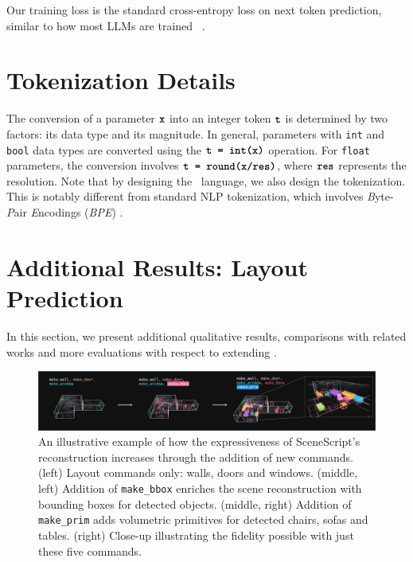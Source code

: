 Our training loss is the standard cross-entropy loss on next token prediction, similar to how most LLMs are trained ~\cite{openai2023gpt4,sutskever2014sequence}. 



%
\section{Tokenization Details}

The conversion of a parameter $\textbf{\texttt{x}}$ into an integer token $\textbf{\texttt{t}}$ is determined by two factors: its data type and its magnitude. In general, parameters with \lstinline[style=dtypestyle]!int! and \lstinline[style=dtypestyle]!bool! data types are converted using the $\textbf{\texttt{t = int(x)}}$ operation. For \lstinline[style=dtypestyle]!float! parameters, the conversion involves $\textbf{\texttt{t = round(x/res)}}$, where $\textbf{\texttt{res}}$ represents the resolution. 
Note that  by designing the \METHOD~language,
we also design the tokenization.
This is notably different from standard NLP tokenization,
which involves \emph{B}yte-\emph{P}air \emph{E}ncodings (\emph{BPE}) \cite{openai2023gpt4}.




\section{Additional Results: Layout Prediction}
In this section,
we present additional qualitative results,
comparisons with related works and
more evaluations with respect to extending \METHOD{}.

\begin{figure}[t]
    \centering
    \includegraphics[width=\columnwidth]{figs/commands_wide.pdf}
    \caption{
        An illustrative example of how the expressiveness of SceneScript's reconstruction increases through the addition of new commands.
        (left) Layout commands only: walls, doors and windows.
        (middle, left) Addition of \texttt{make\_bbox} enriches the scene reconstruction with bounding boxes for detected objects.
        (middle, right) Addition of \texttt{make\_prim} adds volumetric primitives for detected chairs, sofas and tables.
        (right) Close-up illustrating the fidelity possible with just these five commands.
    }
    \label{fig:commandVisExamples0}
\end{figure}


